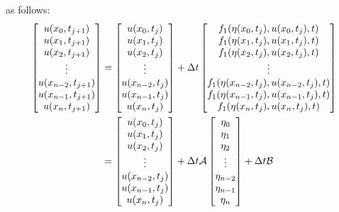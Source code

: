 \documentclass[10pt,reqno,oneside,a4paper, landscape]{article}
\begin{document}
as follows:
\begin{align*}
\begin{bmatrix}
u(x_0, t_{j+1}) \\
u(x_1, t_{j+1}) \\
u(x_2, t_{j+1}) \\
\vdots \\
u(x_{n-2}, t_{j+1}) \\
u(x_{n-1}, t_{j+1}) \\
u(x_n, t_{j+1}) 
\end{bmatrix} 
&= 
\begin{bmatrix}
u(x_0, t_{j}) \\
u(x_1, t_{j}) \\
u(x_2, t_{j}) \\
\vdots \\
u(x_{n-2}, t_{j}) \\
u(x_{n-1}, t_{j}) \\
u(x_n, t_{j}) 
\end{bmatrix} 
+ \Delta t 
\begin{bmatrix}
f_1(\eta(x_0, t_j), u(x_0, t_j), t)\\
f_1(\eta(x_1, t_j), u(x_1, t_j), t) \\
 f_1(\eta(x_2, t_j), u(x_2, t_j), t) \\
\vdots \\
f_1(\eta(x_{n-2}, t_j), u(x_{n-2}, t_j), t)\\
f_1(\eta(x_{n-1}, t_j), u(x_{n-1}, t_j), t) \\
f_1(\eta(x_n, t_j), u(x_n, t_j), t) 
\end{bmatrix} \\
&= 
\begin{bmatrix}
u(x_0, t_{j}) \\
u(x_1, t_{j}) \\
u(x_2, t_{j}) \\
\vdots \\
u(x_{n-2}, t_{j}) \\
u(x_{n-1}, t_{j}) \\
u(x_n, t_{j}) 
\end{bmatrix} 
+ \Delta t \mathcal{A} \begin{bmatrix}
\eta_0 \\
\eta_1 \\
\eta_2 \\
\vdots \\
\eta_{n-2} \\
\eta_{n-1} \\
\eta_{n}
\end{bmatrix}
+ \Delta t \mathcal{B}
\end{align*}
\end{document}
